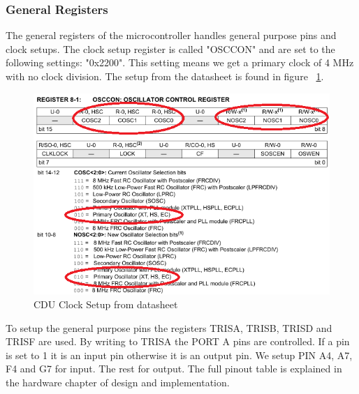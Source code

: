 \subsubsection{General Registers}
The general registers of the microcontroller handles general purpose pins and clock setups. The clock setup register is called "OSCCON" and are set to the following settings: "0x2200". This setting means we get a primary clock of 4 MHz with no clock division. The setup from the datasheet is found in figure ~\ref{fig:clocksetup}.\\
\begin{figure}[H]
\centering
\includegraphics[width=1\textwidth]{billeder/clocksetup}
\caption{CDU Clock Setup from datasheet}
\label{fig:clocksetup}
\end{figure}
To setup the general purpose pins the registers TRISA, TRISB, TRISD and TRISF are used. By writing to TRISA the PORT A pins are controlled. If a pin is set to 1 it is an input pin otherwise it is an output pin. We setup PIN A4, A7, F4 and G7 for input. The rest for output. The full pinout table is explained in the hardware chapter of design and implementation.
